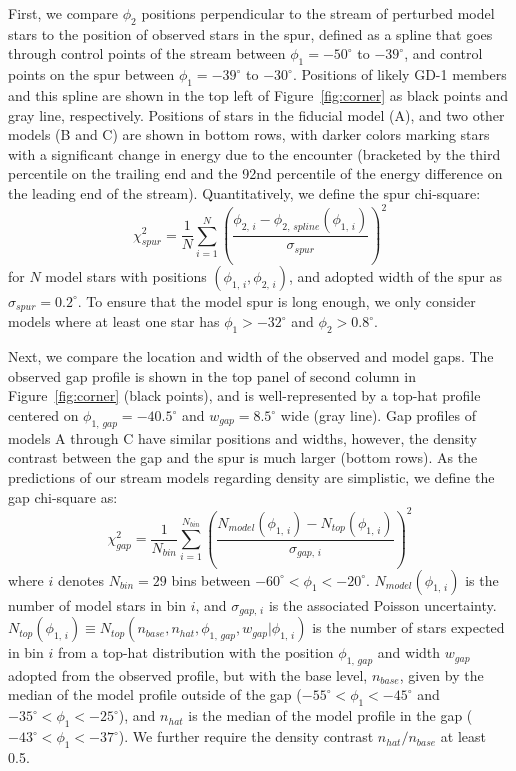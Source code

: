 \documentclass[twocolumn]{aastex62}
\begin{document}
First, we compare $\phi_2$ positions perpendicular to the stream of perturbed model stars to the position of observed stars in the spur, defined as a spline that goes through control points of the stream between $\phi_1=-50^\circ$ to $-39^\circ$, and control points on the spur between $\phi_1=-39^\circ$ to $-30^\circ$.
Positions of likely GD-1 members and this spline are shown in the top left of Figure~\ref{fig:corner} as black points and gray line, respectively.
Positions of stars in the fiducial model (A), and two other models (B and C) are shown in bottom rows, with darker colors marking stars with a significant change in energy due to the encounter (bracketed by the third percentile on the trailing end and the 92nd percentile of the energy difference on the leading end of the stream). 
Quantitatively, we define the spur chi-square:
\begin{equation}
\chi^2_{spur} = \frac{1}{N}\sum_{i=1}^{N} \left(\frac{\phi_{2,\,i} - \phi_{2,\,spline}(\phi_{1,\,i})}{\sigma_{spur}}\right)^2 
\end{equation}
for $N$ model stars with positions $(\phi_{1,\,i}, \phi_{2,\,i})$, and adopted width of the spur as $\sigma_{spur} = 0.2^\circ$.
To ensure that the model spur is long enough, we only consider models where at least one star has $\phi_1>-32^\circ$ and $\phi_2>0.8^\circ$.

Next, we compare the location and width of the observed and model gaps.
The observed gap profile is shown in the top panel of second column in Figure~\ref{fig:corner} (black points), and is well-represented by a top-hat profile centered on $\phi_{1,\,gap}=-40.5^\circ$ and $w_{gap}=8.5^\circ$ wide (gray line).
Gap profiles of models A through C have similar positions and widths, however, the density contrast between the gap and the spur is much larger (bottom rows).
As the predictions of our stream models regarding density are simplistic, we define the gap chi-square as:
\begin{equation}
\chi^2_{gap} = \frac{1}{N_{bin}}\sum_{i=1}^{N_{bin}} \left(\frac{N_{model}(\phi_{1,\,i}) - N_{top}(\phi_{1,\,i})}{\sigma_{gap,\,i}}\right)^2
\end{equation}
where $i$ denotes $N_{bin}=29$ bins between $-60^\circ<\phi_1<-20^\circ$.
$N_{model}(\phi_{1,\,i})$ is the number of model stars in bin $i$, and $\sigma_{gap,\,i}$ is the associated Poisson uncertainty.
$N_{top}(\phi_{1,\,i})\equiv N_{top}(n_{base}, n_{hat}, \phi_{1,\,gap}, w_{gap} | \phi_{1,\,i})$ is the number of stars expected in bin $i$ from a top-hat distribution with the position $\phi_{1,\,gap}$ and width $w_{gap}$ adopted from the observed profile, but with the base level, $n_{base}$, given by the median of the model profile outside of the gap ($-55^\circ<\phi_1<-45^\circ$ and $-35^\circ<\phi_1<-25^\circ$), and $n_{hat}$ is the median of the model profile in the gap ($-43^\circ<\phi_1<-37^\circ$).
We further require the density contrast $n_{hat} / n_{base}$ at least 0.5.
\end{document}
